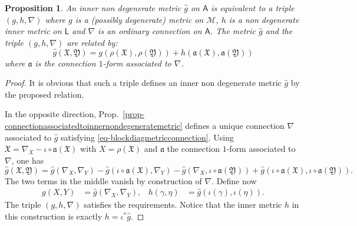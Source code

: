 \documentclass[number]{elsarticle}
\newtheorem{proposition}[theorem]{Proposition}
\theoremstyle{definition}
\theoremstyle{remark}
\numberwithin{equation}{section}
\begin{document}
\begin{proposition}
\label{prop-tripleforinnernondegeneratemetric}
An inner non degenerate metric ${{\widehat{g}}}$ on ${{{{\mathbf{\mathsf{{A}}}}}}}$ is equivalent to a triple $(g, h, \nabla)$ where $g$ is a  (possibly degenerate) metric on ${{{{\mathcal{{M}}}}}}$, $h$ is a non degenerate inner metric on ${{{{\mathbf{\mathsf{{L}}}}}}}$ and $\nabla$ is an ordinary connection on ${{{{\mathbf{\mathsf{{A}}}}}}}$. 
The metric ${{\widehat{g}}}$ and the triple $(g, h, \nabla)$ are related by:
\begin{equation}
\label{eq-hatggha}
{{\widehat{g}}}({{\mathfrak X}}, {{\mathfrak Y}}) = g(\rho({{\mathfrak X}}), \rho({{\mathfrak Y}})) + h( {\mathfrak{a}}({{\mathfrak X}}), {\mathfrak{a}}({{\mathfrak Y}}))
\end{equation}
where ${\mathfrak{a}}$ is the connection $1$-form associated to $\nabla$.
\end{proposition}

\begin{proof}
It is obvious that such a triple defines an inner non degenerate metric ${{\widehat{g}}}$ by the proposed relation.

In the opposite direction, Prop.~\ref{prop-connectionassociatedtoinnernondegeneratemetric} defines a unique connection $\nabla$ associated to ${{\widehat{g}}}$ satisfying \eqref{eq-blockdiagmetricconnection}. Using ${{\mathfrak X}} = \nabla_X - \iota \circ {\mathfrak{a}}({{\mathfrak X}})$ with $X = \rho({{\mathfrak X}})$ and ${\mathfrak{a}}$ the connection $1$-form associated to $\nabla$, one has
\begin{equation*}
{{\widehat{g}}}({{\mathfrak X}}, {{\mathfrak Y}}) =
 {{\widehat{g}}}(\nabla_X, \nabla_Y) - {{\widehat{g}}}(\iota \circ {\mathfrak{a}}({{\mathfrak X}}), \nabla_Y) - {{\widehat{g}}}(\nabla_X, \iota \circ {\mathfrak{a}}({{\mathfrak Y}})) + {{\widehat{g}}}(\iota \circ {\mathfrak{a}}({{\mathfrak X}}), \iota \circ {\mathfrak{a}}({{\mathfrak Y}})).
\end{equation*}
The two terms in the middle vanish by construction of $\nabla$. Define now
\begin{align*}
g(X,Y) &= {{\widehat{g}}}(\nabla_X, \nabla_Y),
&
h(\gamma, \eta) &= {{\widehat{g}}}(\iota(\gamma), \iota(\eta)).
\end{align*}
The triple $(g, h, \nabla)$ satisfies the requirements. Notice that the inner metric $h$ in this construction is exactly $h = \iota^\ast {{\widehat{g}}}$.
\end{proof}
\end{document}
